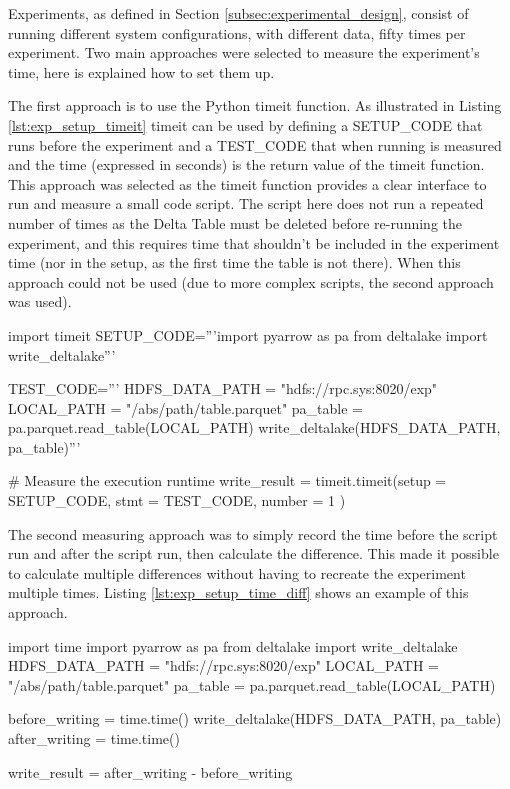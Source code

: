 Experiments, as defined in Section \ref{subsec:experimental_design}, consist of running different system configurations, with different data, fifty times per experiment. Two main approaches were selected to measure the experiment's time, here is explained how to set them up.

The first approach is to use the Python timeit function. As illustrated in Listing \ref{lst:exp_setup_timeit} timeit can be used by defining a SETUP\_CODE that runs before the experiment and a TEST\_CODE that when running is measured and the time (expressed in seconds) is the return value of the timeit function. This approach was selected as the timeit function provides a clear interface to run and measure a small code script. The script here does not run a repeated number of times as the Delta Table must be deleted before re-running the experiment, and this requires time that shouldn't be included in the experiment time (nor in the setup, as the first time the table is not there). When this approach could not be used (due to more complex scripts, the second approach was used).

\begin{python}[caption={[Measuring latency using Timeit]Timeit usage to measure the time required to write a Delta Lake table to \gls{HopsFS}.}, label={lst:exp_setup_timeit}]
import timeit
SETUP_CODE='''import pyarrow as pa
from deltalake import write_deltalake'''
    
TEST_CODE='''
HDFS_DATA_PATH = "hdfs://rpc.sys:8020/exp" 
LOCAL_PATH = "/abs/path/table.parquet"
pa_table = pa.parquet.read_table(LOCAL_PATH)
write_deltalake(HDFS_DATA_PATH, pa_table)'''

# Measure the execution runtime
write_result = timeit.timeit(setup  = SETUP_CODE,
                             stmt   = TEST_CODE,
                             number = 1          )
\end{python}
\medskip

The second measuring approach was to simply record the time before the script run and after the script run, then calculate the difference. This made it possible to calculate multiple differences without having to recreate the experiment multiple times. Listing \ref{lst:exp_setup_time_diff} shows an example of this approach.

\begin{python}[caption={[Measuring latency using the time difference]A simple time difference approach to measure the time required to write a Delta Lake table to \gls{HopsFS}.}, label={lst:exp_setup_time_diff}]
import time
import pyarrow as pa
from deltalake import write_deltalake
HDFS_DATA_PATH = "hdfs://rpc.sys:8020/exp" 
LOCAL_PATH = "/abs/path/table.parquet"
pa_table = pa.parquet.read_table(LOCAL_PATH)

before_writing = time.time()
write_deltalake(HDFS_DATA_PATH, pa_table)
after_writing = time.time()

write_result = after_writing - before_writing
\end{python}

